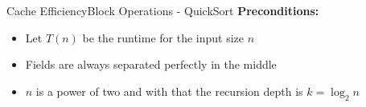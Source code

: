 

\begin{frame}{Cache Efficiency}{Block Operations - QuickSort}
  \textbf{Preconditions:}
  \begin{itemize}
    \item
      Let {\color{Mittel-Blau}$T(n)$} be the runtime for the
      {\color{Mittel-Blau}input size $n$}
    \item
      Fields are always separated perfectly in the middle
    \item
      $n$ is a power of two and with that the
      {\color{Mittel-Blau}recursion depth is $k = \log_2 n$}
  \end{itemize}
\end{frame}


